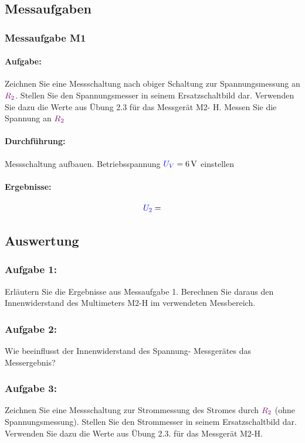 \documentclass[11pt,a4paper,titlepage,parskip=half]{scrreprt}
\begin{document}
            \subsection{Messaufgaben}
            \subsubsection{Messaufgabe M1}
            \paragraph{Aufgabe:} Zeichnen Sie eine Messschaltung nach obiger Schaltung zur Spannungsmessung an $\textcolor{violet}{R_2}$.   Stellen Sie den Spannungsmesser in seinem Ersatzschaltbild dar. Verwenden Sie dazu die Werte aus Übung 2.3 für das Messgerät M2- H. Messen Sie  die Spannung an $\textcolor{violet}{R_2}$ 
            \paragraph{Durchführung:} Messschaltung aufbauen. Betriebsspannung $\textcolor{blue}{U_V} = \SI{6}{\volt}$ einstellen
            \paragraph{Ergebnisse:}
                \begin{align*}
                    \textcolor{blue}{U_2} = 
                \end{align*}
           
            
            \subsection{Auswertung}
            \subsubsection{Aufgabe 1:}  Erläutern Sie die Ergebnisse aus Messaufgabe 1. Berechnen Sie daraus den Innenwiderstand des Multimeters M2-H im verwendeten Messbereich.
               
            \subsubsection{Aufgabe 2:}  Wie beeinflusst der Innenwiderstand des Spannung- Messgerätes das Messergebnis?
            
               
            \subsubsection{Aufgabe 3:} Zeichnen Sie eine Messschaltung zur Strommessung des Stromes durch $\textcolor{violet}{R_2}$ (ohne Spannungsmessung). Stellen Sie den Strommesser in seinem Ersatzschaltbild dar. Verwenden Sie dazu die Werte aus Übung 2.3. für das Messgerät M2-H.
             \
\end{document}
